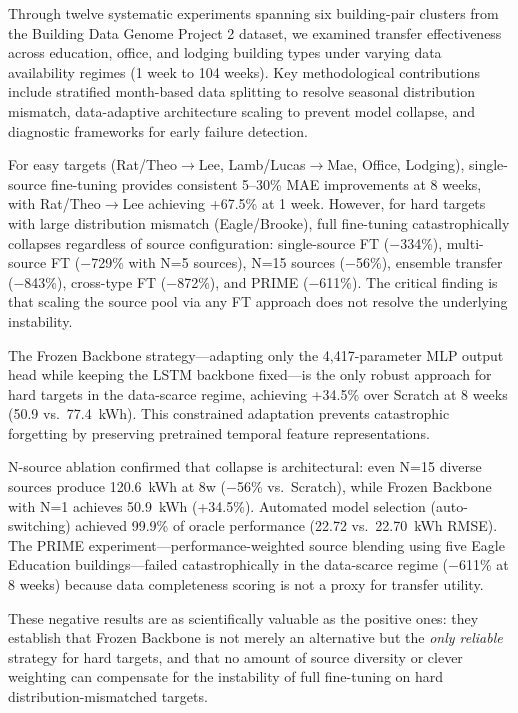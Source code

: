 \documentclass[12pt,a4paper]{report}
\begin{document}
Through twelve systematic experiments spanning six building-pair clusters from the Building Data Genome Project 2 dataset, we examined transfer effectiveness across education, office, and lodging building types under varying data availability regimes (1 week to 104 weeks). Key methodological contributions include stratified month-based data splitting to resolve seasonal distribution mismatch, data-adaptive architecture scaling to prevent model collapse, and diagnostic frameworks for early failure detection.

For easy targets (Rat/Theo$\to$Lee, Lamb/Lucas$\to$Mae, Office, Lodging), single-source fine-tuning provides consistent 5--30\% MAE improvements at 8 weeks, with Rat/Theo$\to$Lee achieving +67.5\% at 1 week. However, for hard targets with large distribution mismatch (Eagle/Brooke), full fine-tuning catastrophically collapses regardless of source configuration: single-source FT ($-$334\%), multi-source FT ($-$729\% with N=5 sources), N=15 sources ($-$56\%), ensemble transfer ($-$843\%), cross-type FT ($-$872\%), and PRIME ($-$611\%). The critical finding is that scaling the source pool via any FT approach does not resolve the underlying instability.

The Frozen Backbone strategy---adapting only the 4,417-parameter MLP output head while keeping the LSTM backbone fixed---is the only robust approach for hard targets in the data-scarce regime, achieving +34.5\% over Scratch at 8 weeks (50.9 vs.\ 77.4~kWh). This constrained adaptation prevents catastrophic forgetting by preserving pretrained temporal feature representations.

N-source ablation confirmed that collapse is architectural: even N=15 diverse sources produce 120.6~kWh at 8w ($-$56\% vs.\ Scratch), while Frozen Backbone with N=1 achieves 50.9~kWh (+34.5\%). Automated model selection (auto-switching) achieved 99.9\% of oracle performance (22.72 vs.\ 22.70~kWh RMSE). The PRIME experiment---performance-weighted source blending using five Eagle Education buildings---failed catastrophically in the data-scarce regime ($-$611\% at 8 weeks) because data completeness scoring is not a proxy for transfer utility.

These negative results are as scientifically valuable as the positive ones: they establish that Frozen Backbone is not merely an alternative but the \textit{only reliable} strategy for hard targets, and that no amount of source diversity or clever weighting can compensate for the instability of full fine-tuning on hard distribution-mismatched targets.
\end{document}
